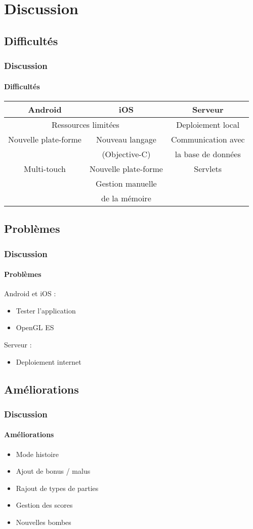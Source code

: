\section{Discussion}

	\subsection{Difficultés}
		\begin{frame}
			\frametitle{Discussion}
			\framesubtitle{Difficultés}
				\begin{tabular}{|c|c|c|}
					Android 			 & iOS 					& Serveur \\\hline
					\multicolumn{2}{|c|}{Ressources limitées} 	& Deploiement local\\
					Nouvelle plate-forme & Nouveau langage  	& Communication avec \\
										 & (Objective-C) 		& la base de données\\
					Multi-touch 		 & Nouvelle plate-forme & Servlets\\
						  				 & Gestion manuelle 	& \\
						  				 & de la mémoire 		& \\

			\end{tabular}
		\end{frame}
		
		
	\subsection{Problèmes}
		\begin{frame}
			\frametitle{Discussion}
			\framesubtitle{Problèmes}
			Android et iOS :
			\begin{itemize}
				\item Tester l'application
				\item OpenGL ES
			\end{itemize}
			
			Serveur :
			\begin{itemize}
				\item Deploiement internet
			\end{itemize}
						
		\end{frame}
		
		
	\subsection{Améliorations}
		\begin{frame}
			\frametitle{Discussion}
			\framesubtitle{Améliorations}
			\begin{itemize}
				\item Mode histoire
				\item Ajout de bonus / malus
				\item Rajout de types de parties
				\item Gestion des scores
				\item Nouvelles bombes
			\end{itemize}
		\end{frame}
